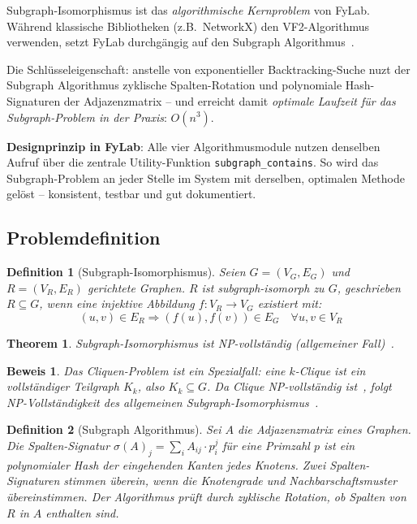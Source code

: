 \documentclass[a4paper,12pt]{article}
\newtheorem{definition}{Definition}
\newtheorem{theorem}{Theorem}
\newtheorem*{beweis*}{Beweis}
\begin{document}
Subgraph-Isomorphismus ist das \emph{algorithmische Kernproblem} von FyLab.
Während klassische Bibliotheken (z.B.\ NetworkX) den VF2-Algorithmus~\cite{cordella2004}
verwenden, setzt FyLab durchgängig auf den Subgraph Algorithmus~\cite{subgraph}.

Die Schlüsseleigenschaft: anstelle von exponentieller Backtracking-Suche
nuzt der Subgraph Algorithmus zyklische Spalten-Rotation und
polynomiale Hash-Signaturen der Adjazenzmatrix -- und erreicht damit
\emph{optimale Laufzeit für das Subgraph-Problem in der Praxis}: $O(n^3)$.

\textbf{Designprinzip in FyLab}: Alle vier Algorithmusmodule nutzen
denselben Aufruf über die zentrale Utility-Funktion \texttt{subgraph\_contains}.
So wird das Subgraph-Problem an jeder Stelle im System mit derselben,
optimalen Methode gelöst -- konsistent, testbar und gut dokumentiert.

\subsection{Problemdefinition}

\begin{definition}[Subgraph-Isomorphismus]
    Seien $G = (V_G, E_G)$ und $R = (V_R, E_R)$ gerichtete Graphen.
    $R$ ist \emph{subgraph-isomorph} zu $G$, geschrieben $R \subseteq G$,
    wenn eine injektive Abbildung $f: V_R \to V_G$ existiert mit:
    \[
        (u, v) \in E_R \Rightarrow (f(u), f(v)) \in E_G \quad
        \forall u, v \in V_R
    \]
\end{definition}

\begin{theorem}
    Subgraph-Isomorphismus ist NP-vollständig (allgemeiner Fall)~\cite{cook1972, garey1979}.
\end{theorem}

\begin{beweis*}
    Das Cliquen-Problem ist ein Spezialfall: eine $k$-Clique ist ein
    vollständiger Teilgraph $K_k$, also $K_k \subseteq G$.
    Da Clique NP-vollständig ist~\cite{garey1979}, folgt NP-Vollständigkeit des allgemeinen
    Subgraph-Isomorphismus~\cite{ullmann1976}.
\end{beweis*}

\begin{definition}[Subgraph Algorithmus]
    Sei $A$ die Adjazenzmatrix eines Graphen. Die \emph{Spalten-Signatur}
    $\sigma(A)_j = \sum_i A_{ij} \cdot p_i^j$ für eine Primzahl $p$
    ist ein polynomialer Hash der eingehenden Kanten jedes Knotens.
    Zwei Spalten-Signaturen stimmen überein, wenn die Knotengrade und
    Nachbarschaftsmuster übereinstimmen.
    Der Algorithmus prüft durch zyklische Rotation, ob Spalten von $R$
    in $A$ enthalten sind.
\end{definition}
\end{document}
